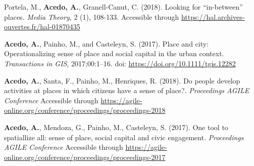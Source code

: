 \begin{cventries}
\vspace{-4mm}
  \cventry
    {} %
    {} %
    {} %
    {} %
    {\begin{cvitems} %
        \item {Portela, M., {\bf Acedo, A.}, Granell-Canut, C. (2018). Looking for “in-between” places. {\it Media Theory}, 2 (1), 108-133. Accessible through \url{https://hal.archives-ouvertes.fr/hal-01870435}}
      \end{cvitems}}

\vspace{-4mm}
  \cventry
    {} %
    {} %
    {} %
    {} %
    {\begin{cvitems} %
        \item {{\bf Acedo, A.}, Painho, M., and Casteleyn, S. (2017). Place and city: Operationalizing sense of place and social capital in the urban context. {\it Transactions in GIS}, 2017;00:1–16. doi: \url{https://doi.org/10.1111/tgis.12282}}
      \end{cvitems}}      

\vspace{-4mm}
\end{cventries}


\begin{cventries}

\vspace{-4mm}
  \cventry
    {} %
    {} %
    {} %
    {} %
    {\begin{cvitems} %
        \item{{\bf Acedo, A.}, Santa, F., Painho, M., Henriques, R. (2018). Do people develop activities at places in which citizens have a sense of place?. {\it Proceedings AGILE Conference} Accessible through \url{ https://agile-online.org/conference/proceedings/proceedings-2018}}
      \end{cvitems}}

\vspace{-4mm}
   \cventry
    {} %
    {} %
    {} %
    {} %
    {\begin{cvitems} %
        \item{{\bf Acedo, A.}, Mendoza, G., Painho, M., Casteleyn, S. (2017). One tool to spatiallize all: sense of place, social capital and civic engagement. {\it Proceedings AGILE Conference} Accessible through \url{ https://agile-online.org/conference/proceedings/proceedings-2017}}
      \end{cvitems}}
      
\vspace{-4mm}      

\end{cventries}


